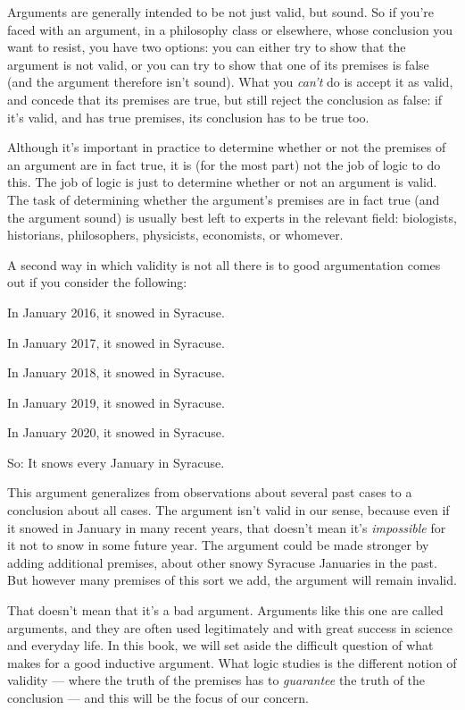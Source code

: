 Arguments are generally intended to be not just valid, but sound.  So if you're faced with an argument, in a philosophy class or elsewhere, whose conclusion you want to resist, you have two options: you can either try to show that the argument is not valid, or you can try to show that one of its premises is false (and the argument therefore isn't sound).  What you \emph{can't} do is accept it as valid, and concede that its premises are true, but still reject the conclusion as false: if it's valid, and has true premises, its conclusion has to be true too.

Although it's important in practice to determine whether or not the premises of an argument are in fact true, it is (for the most part) not the job of logic to do this.  The job of logic is just to determine whether or not an argument is valid.  The task of determining whether the argument's premises are in fact true (and the argument sound) is usually best left to experts in the relevant field: biologists,  historians, philosophers, physicists, economists, or whomever.

A second way in which validity is not all there is to good argumentation comes out if you consider the following:
	\begin{earg}
		\item[] In January 2016, it snowed in Syracuse.
		\item[] In January 2017, it snowed in Syracuse.
		\item[] In January 2018, it snowed in Syracuse.
		\item[] In January 2019, it snowed in Syracuse.
		\item[] In January 2020, it snowed in Syracuse.
	\item[So:] It snows every January in Syracuse.
\end{earg}

This argument generalizes from observations about several past cases to a conclusion about all cases. The argument isn't valid in our sense, because even if it snowed in January in many recent years, that doesn't mean it's \emph{impossible} for it not to snow in some future year.  The argument could be made stronger by adding additional premises, about other snowy Syracuse Januaries in the past. But however many premises of this sort we add, the argument will remain invalid.

That doesn't mean that it's a bad argument.  Arguments like this one are called  arguments, and they are often used legitimately and with great success in science and everyday life.  In this book, we will set aside  the difficult question of what makes for a good inductive argument.  What logic studies is the different notion of  validity --- where the truth of the premises has to \emph{guarantee} the truth of the conclusion --- and this will be the focus of our concern.

